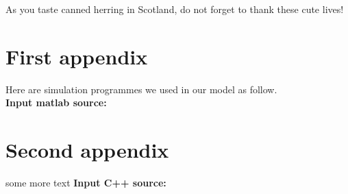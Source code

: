 \documentclass{mcmthesis}
\begin{document}
As you taste canned herring in Scotland, do not forget to thank these cute lives!










\begin{appendices}

\section{First appendix}

\lipsum[13]

Here are simulation programmes we used in our model as follow.\\

\textbf{\textcolor[rgb]{0.98,0.00,0.00}{Input matlab source:}}
% 

\section{Second appendix}

some more text \textcolor[rgb]{0.98,0.00,0.00}{\textbf{Input C++ source:}}
% 

\end{appendices}
\end{document}
